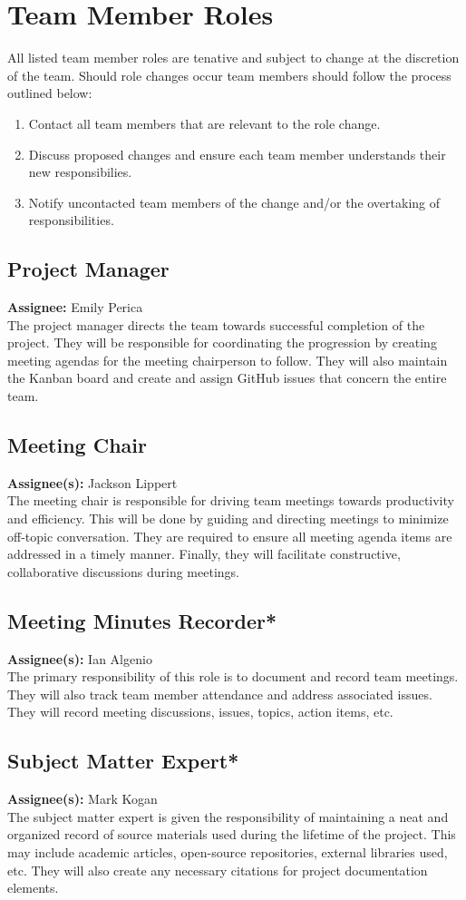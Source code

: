 \documentclass{article}
\begin{document}
\section{Team Member Roles}
All listed team member roles are tenative and subject to change at the discretion of the team. Should role changes occur
team members should follow the process outlined below: 
\begin{enumerate}
  \item Contact all team members that are relevant to the role change.
  \item Discuss proposed changes and ensure each team member understands their new responsibilies.
  \item Notify uncontacted team members of the change and/or the overtaking of responsibilities. 
\end{enumerate}
\subsection{Project Manager}
\textbf{Assignee:} Emily Perica\\
The project manager directs the team towards successful completion of the project. 
They will be responsible for coordinating the progression by creating meeting agendas for the meeting chairperson 
to follow. They will also maintain the Kanban board and create and assign GitHub issues that concern the entire team.
\subsection{Meeting Chair}
\textbf{Assignee(s):} Jackson Lippert\\
The meeting chair is responsible for driving team meetings towards productivity and efficiency. 
This will be done by guiding and directing meetings to minimize off-topic conversation. They are required to ensure all 
meeting agenda items are addressed in a timely manner. Finally, they will facilitate constructive, collaborative
discussions during meetings.
\subsection{Meeting Minutes Recorder*}
\textbf{Assignee(s):} Ian Algenio\\
The primary responsibility of this role is to document and record team meetings. They will also track team member attendance
and address associated issues. They will record meeting discussions, issues, topics, action items, etc.
\subsection{Subject Matter Expert*}
\textbf{Assignee(s):} Mark Kogan\\
The subject matter expert is given the responsibility of maintaining a neat and organized record of source materials used 
during the lifetime of the project. This may include academic articles, open-source repositories, external libraries used, etc. 
They will also create any necessary citations for project documentation elements.
\end{document}
